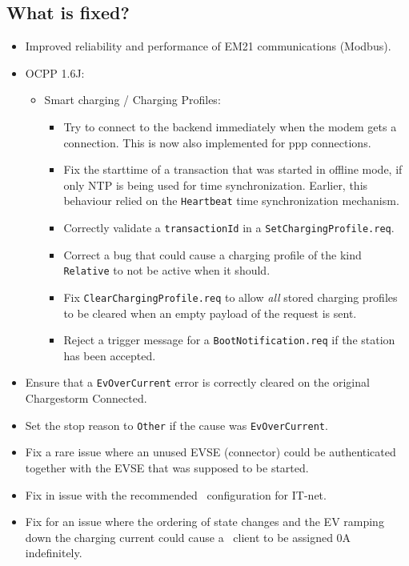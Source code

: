 \documentclass{scrartcl}
\begin{document}
\subsection*{What is fixed?}
\begin{itemize}
\item Improved reliability and performance of EM21 communications (Modbus).
\item OCPP 1.6J:
  \begin{itemize}
  \item Smart charging / Charging Profiles:
    \begin{itemize}
    \item Try to connect to the backend immediately when the modem gets a
      connection. This is now also implemented for ppp connections.
    \item Fix the starttime of a transaction that was started in offline mode,
      if only NTP is being used for time synchronization. Earlier, this
      behaviour relied on the \verb|Heartbeat| time synchronization mechanism.
    \item Correctly validate a \verb|transactionId| in a
      \verb|SetChargingProfile.req|.
    \item Correct a bug that could cause a charging profile of the kind
      \verb|Relative| to not be active when it should.
    \item Fix \verb|ClearChargingProfile.req| to allow \emph{all} stored
      charging profiles to be cleared when an empty payload of the request is
      sent.
    \item Reject a trigger message for a \verb|BootNotification.req| if the
      station has been accepted.
    \end{itemize}
  \end{itemize}
\item Ensure that a \verb|EvOverCurrent| error is correctly cleared on the
  original Chargestorm Connected.
\item Set the stop reason to \verb|Other| if the cause was
  \verb|EvOverCurrent|.
\item Fix a rare issue where an unused EVSE (connector) could be authenticated
  together with the EVSE that was supposed to be started.
\item Fix in issue with the recommended \nanogrid\ configuration for IT-net.
\item Fix for an issue where the ordering of state changes and the EV ramping
  down the charging current could cause a \nanogrid\ client to be assigned 0A
  indefinitely.
\end{itemize}
\end{document}
